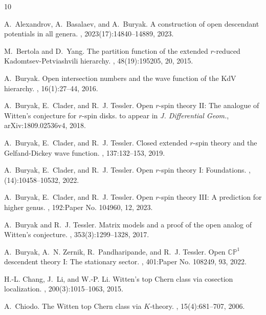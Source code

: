 \documentclass[11pt]{amsart}
\theoremstyle{definition}
\theoremstyle{remark}
\newcommand{\<}{\left<}
\renewcommand{\>}{\right>}
\numberwithin{equation}{section}
\begin{document}
\begin{thebibliography}{10}

A.~Alexandrov, A.~Basalaev, and A.~Buryak.
\newblock A construction of open descendant potentials in all genera.
,
  2023(17):14840--14889, 2023.

M.~Bertola and D.~Yang.
\newblock The partition function of the extended {$r$}-reduced
  {K}adomtsev-{P}etviashvili hierarchy.
, 48(19):195205, 20, 2015.

A.~Buryak.
\newblock Open intersection numbers and the wave function of the {K}d{V}
  hierarchy.
, 16(1):27--44, 2016.

A.~Buryak, E.~Clader, and R.~J. Tessler.
\newblock Open $r$-spin theory {I}{I}: {T}he analogue of {W}itten's conjecture
  for $r$-spin disks.
\newblock to appear in \textit{J. Differential Geom.}, arXiv:1809.02536v4,
  2018.

A.~Buryak, E.~Clader, and R.~J. Tessler.
\newblock Closed extended {$r$}-spin theory and the {G}elfand-{D}ickey wave
  function.
, 137:132--153, 2019.

A.~Buryak, E.~Clader, and R.~J. Tessler.
\newblock Open {$r$}-spin theory {I}: {F}oundations.
, (14):10458--10532, 2022.

A.~Buryak, E.~Clader, and R.~J. Tessler.
\newblock Open {$r$}-spin theory {III}: {A} prediction for higher genus.
, 192:Paper No. 104960, 12, 2023.

A.~Buryak and R.~J. Tessler.
\newblock Matrix models and a proof of the open analog of {W}itten's
  conjecture.
, 353(3):1299--1328, 2017.

A.~Buryak, A.~N. Zernik, R.~Pandharipande, and R.~J. Tessler.
\newblock Open {$\mathbb{CP}^1$} descendent theory {I}: {T}he stationary
  sector.
, 401:Paper No. 108249, 93, 2022.

H.-L. Chang, J.~Li, and W.-P. Li.
\newblock Witten's top {C}hern class via cosection localization.
, 200(3):1015--1063, 2015.

A.~Chiodo.
\newblock The {W}itten top {C}hern class via {$K$}-theory.
, 15(4):681--707, 2006.


\end{thebibliography}
\end{document}

